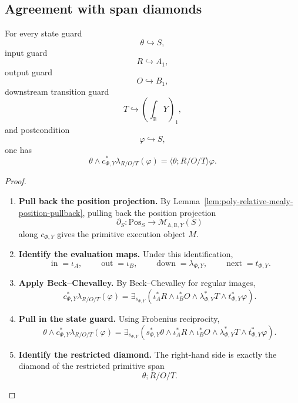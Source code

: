 \subsection{Agreement with span diamonds}
\label{subsec:poly-relative-lifting-span-agreement}

\begin{theorem}
\label{thm:poly-relative-lifting-span-agreement}
For every state guard
\[
\theta\hookrightarrow S,
\]
input guard
\[
R\hookrightarrow A_1,
\]
output guard
\[
O\hookrightarrow B_1,
\]
downstream transition guard
\[
T\hookrightarrow\left(\int_{\mathbb B}Y\right)_1,
\]
and postcondition
\[
\varphi\hookrightarrow S,
\]
one has
\[
\theta\wedge c_{\Phi,Y}^{\ast}\lambda_{R/O/T}(\varphi)
=
\langle\theta;R/O/T\rangle\varphi.
\]
\end{theorem}

\begin{proof}
\leavevmode
\begin{enumerate}
\item \textbf{Pull back the position projection.}
By Lemma~\ref{lem:poly-relative-mealy-position-pullback}, pulling back the
position projection
\[
\partial_S:\mathrm{Pos}_S\to\mathcal M_{\mathbb A,\mathbb B,Y}(S)
\]
along \(c_{\Phi,Y}\) gives the primitive execution object \(M\).

\item \textbf{Identify the evaluation maps.}
Under this identification,
\[
\operatorname{in}=\iota_A,
\qquad
\operatorname{out}=\iota_B,
\qquad
\operatorname{down}=\lambda_{\Phi,Y},
\qquad
\operatorname{next}=t_{\Phi,Y}.
\]

\item \textbf{Apply Beck--Chevalley.}
By Beck--Chevalley for regular images,
\[
c_{\Phi,Y}^{\ast}\lambda_{R/O/T}(\varphi)
=
\exists_{s_{\Phi,Y}}
\left(
\iota_A^\ast R
\wedge
\iota_B^\ast O
\wedge
\lambda_{\Phi,Y}^\ast T
\wedge
t_{\Phi,Y}^\ast\varphi
\right).
\]

\item \textbf{Pull in the state guard.}
Using Frobenius reciprocity,
\[
\theta\wedge c_{\Phi,Y}^{\ast}\lambda_{R/O/T}(\varphi)
=
\exists_{s_{\Phi,Y}}
\left(
s_{\Phi,Y}^\ast\theta
\wedge
\iota_A^\ast R
\wedge
\iota_B^\ast O
\wedge
\lambda_{\Phi,Y}^\ast T
\wedge
t_{\Phi,Y}^\ast\varphi
\right).
\]

\item \textbf{Identify the restricted diamond.}
The right-hand side is exactly the diamond of the restricted primitive span
\[
\theta;R/O/T.
\]
\end{enumerate}
\end{proof}

